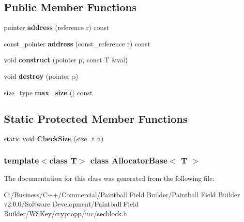 \subsection*{Public Member Functions}
\begin{DoxyCompactItemize}
\item 
\hypertarget{class_allocator_base_ae870664a08034d17cbdc98073fa3d21d}{
pointer {\bfseries address} (reference r) const }
\label{class_allocator_base_ae870664a08034d17cbdc98073fa3d21d}

\item 
\hypertarget{class_allocator_base_aeb51730b092c484ce8dd86dc078ed207}{
const\_\-pointer {\bfseries address} (const\_\-reference r) const }
\label{class_allocator_base_aeb51730b092c484ce8dd86dc078ed207}

\item 
\hypertarget{class_allocator_base_a4816881defdf38aa120c70a03b7da903}{
void {\bfseries construct} (pointer p, const T \&val)}
\label{class_allocator_base_a4816881defdf38aa120c70a03b7da903}

\item 
\hypertarget{class_allocator_base_a740cc02314cba092678ab0545fa6967b}{
void {\bfseries destroy} (pointer p)}
\label{class_allocator_base_a740cc02314cba092678ab0545fa6967b}

\item 
\hypertarget{class_allocator_base_a8934ed4b81ee379ca6e7639987b1927e}{
size\_\-type {\bfseries max\_\-size} () const }
\label{class_allocator_base_a8934ed4b81ee379ca6e7639987b1927e}

\end{DoxyCompactItemize}
\subsection*{Static Protected Member Functions}
\begin{DoxyCompactItemize}
\item 
\hypertarget{class_allocator_base_a1ffea05c1944ec2b9f8fcff4cd9ee717}{
static void {\bfseries CheckSize} (size\_\-t n)}
\label{class_allocator_base_a1ffea05c1944ec2b9f8fcff4cd9ee717}

\end{DoxyCompactItemize}
\subsubsection*{template$<$class T$>$ class AllocatorBase$<$ T $>$}



The documentation for this class was generated from the following file:\begin{DoxyCompactItemize}
\item 
C:/Business/C++/Commercial/Paintball Field Builder/Paintball Field Builder v2.0.0/Software Development/Paintball Field Builder/WSKey/cryptopp/inc/secblock.h\end{DoxyCompactItemize}
